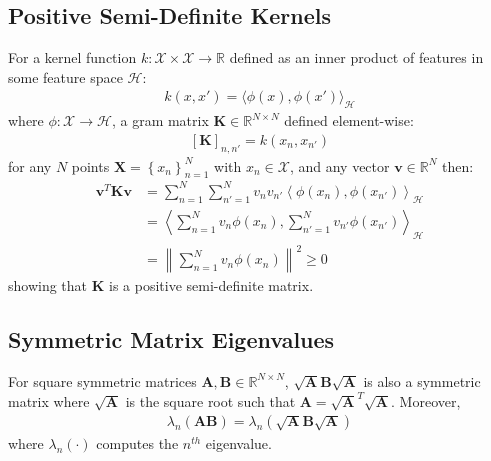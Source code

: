 \documentclass{article}
\numberwithin{equation}{section}
\begin{document}
\subsection{Positive Semi-Definite Kernels} \label{appendix:positive-definite-kernel}
For a kernel function $k: \mathcal{X} \times \mathcal{X} \rightarrow \mathbb{R}$ defined as an inner product of features in some feature space $\mathcal{H}$:
\begin{align}
    k(x, x') = \langle \phi(x), \phi(x') \rangle_{\mathcal{H}}
\end{align}
where $\phi: \mathcal{X} \rightarrow \mathcal{H}$, a gram matrix $\mathbf{K} \in \mathbb{R}^{N\times N}$ defined element-wise:
\begin{align}
    \left[\mathbf{K}\right]_{n, n'} = k(x_n, x_{n'})
\end{align}
for any $N$ points $\mathbf{X} = \left\{x_n\right\}_{n=1}^N$ with $x_n \in \mathcal{X}$, and any vector $\mathbf{v} \in \mathbb{R}^N$ then:
\begin{align}
    \mathbf{v}^T \mathbf{K} \mathbf{v} &= \sum_{n=1}^N\sum_{n'=1}^N v_n v_{n'}  \left\langle \phi(x_n), \phi(x_{n'}) \right\rangle_{\mathcal{H}} \\
    &= \left\langle\sum_{n=1}^N v_n \phi(x_n), \sum_{n'=1}^N  v_{n'}\phi(x_{n'}) \right\rangle_{\mathcal{H}} \\
    &= \left\| \sum_{n=1}^N v_n \phi(x_n) \right\|^2 \geq 0
\end{align}
showing that $\mathbf{K}$ is a positive semi-definite matrix.

\newpage
\subsection{Symmetric Matrix Eigenvalues}\label{appendix:eigenvalue-symmetric-matrix}
For square symmetric matrices $\mathbf{A}, \mathbf{B} \in \mathbb{R}^{N \times N}$, $\sqrt{\mathbf{A}}\mathbf{B}\sqrt{\mathbf{A}}$ is also a symmetric matrix where $\sqrt{\mathbf{A}}$ is the square root such that $\mathbf{A} = \sqrt{\mathbf{A}}^T \sqrt{\mathbf{A}}$. Moreover,
\begin{align}
    \lambda_{n} \left(\mathbf{A} \mathbf{B}\right) = \lambda_{n} \left(\sqrt{\mathbf{A}}\mathbf{B}\sqrt{\mathbf{A}}\right)
\end{align}
where $\lambda_{n}(\cdot)$ computes the $n^{th}$ eigenvalue.

\newpage
\end{document}
